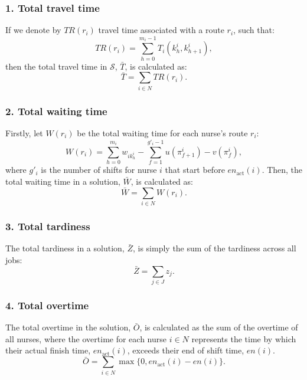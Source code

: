 \documentclass[a4paper,11pt,authoryear]{elsarticle}
\begin{document}
\subsubsection*{1. Total travel time}
\noindent If we denote by $TR(r_i)$ travel time associated with a route $r_i$, such that:
\begin{equation}
	TR(r_i) =  \sum_{h = 0}^{m_i - 1} T_i(k^i_h, k^i_{h + 1}), \label{eq:traveltimenurse}
\end{equation}
then the total travel time in $\mathcal{S}$, $\bar{T}$, is calculated as:
\begin{equation}
	\bar{T} = \sum_{i \in N}  TR(r_i). \label{eq:totaltraveltime}
\end{equation}

\subsubsection*{2. Total waiting time}
\noindent Firstly, let $W(r_i)$ be the total waiting time for each nurse's route $r_i$:
\begin{equation}
	W(r_i) = \displaystyle\sum_{h=0}^{m_i} w_{i k_{h}^i} - \displaystyle\sum_{f=1}^{g'_i - 1} u(\pi_{f+1}^i) - v(\pi_f^i), \label{eq:waitingtimenurse}
\end{equation}
\noindent where $g'_i$ is the number of shifts for nurse $i$ that start before $en_{\text{act}}(i)$. Then, the total waiting time in a solution, $\bar{W}$, is calculated as:
\begin{equation}
     \bar{W} = \sum_{i \in N} W(r_i). \label{eq:totalwaitingtime}
\end{equation}

\subsubsection*{3. Total tardiness}
\noindent The total tardiness in a solution, $\bar{Z}$, is simply the sum of the tardiness across all jobs:
\begin{equation}
    \bar{Z} = \sum_{j \in J} z_j. \label{eq:totaltardiness}
\end{equation}

\subsubsection*{4. Total overtime}
\noindent The total overtime in the solution, $\bar{O}$, is calculated as the sum of the overtime of all nurses, where the overtime for each nurse $i \in N$ represents the time by which their actual finish time, $en_{\text{act}}(i)$, exceeds their end of shift time, $en(i)$. 
\begin{equation}
     \bar{O} = \sum_{i \in N} \max \{0, en_{\text{act}}(i) - en(i)\}. \label{eq:totalovertime}
\end{equation}
\end{document}

